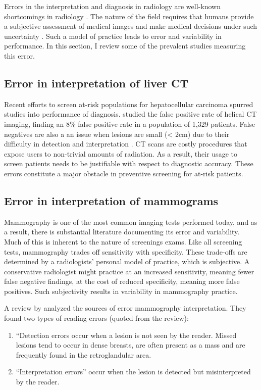 Errors in the interpretation and diagnosis in radiology are well-known shortcomings in radiology \cite{Fitzgerald:2001hn}. The nature of the field requires that humans provide a subjective assessment of medical images and make medical decisions under such uncertainty \cite{Wood:1999ew}. Such a model of practice leads to error and variability in performance. In this section, I review some of the prevalent studies measuring this error.

\subsection{Error in interpretation of liver CT}
Recent efforts to screen at-risk populations for hepatocellular carcinoma spurred studies into performance of diagnosis.  studied the false positive rate of helical CT imaging, finding an 8\% false positive rate in a population of 1,329 patients. False negatives are also a an issue when lesions are small (< 2cm) due to their difficulty in detection and interpretation \cite{Willatt:2008gs,Lencioni:2005ia}. CT scans are costly procedures that expose users to non-trivial amounts of radiation. As a result, their usage to screen patients needs to be justifiable with respect to diagnostic accuracy. These errors constitute a major obstacle in preventive screening for at-risk patients.

\subsection{Error in interpretation of mammograms}
Mammography is one of the most common imaging tests performed today, and as a result, there is substantial literature documenting its error and variability. Much of this is inherent to the nature of screenings exams. Like all screening tests, mammography trades off sensitivity with specificity. These trade-offs are determined by a radiologists' personal model of practice, which is subjective. A conservative radiologist might practice at an increased sensitivity, meaning fewer false negative findings, at the cost of reduced specificity, meaning more false positives. Such subjectivity results in variability in mammography practice. 

A review by  analyzed the sources of error mammography interpretation. They found two types of reading errors (quoted from the review):

\begin{enumerate}
	\item ``Detection errors occur when a lesion is not seen by the reader. Missed lesions tend to occur in dense breasts, are often present as a mass and are frequently found in the retroglandular area.
	
	\item ``Interpretation errors'' occur when the lesion is detected but misinterpreted by the reader.
\end{enumerate}

